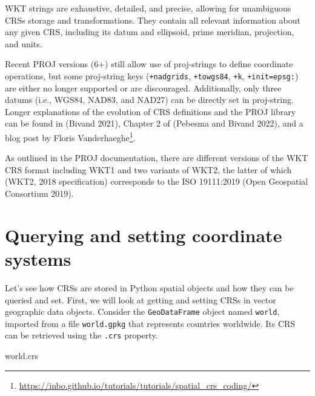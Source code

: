 \documentclass[
  letterpaper,
]{krantz}
\newenvironment{Shaded}{\begin{snugshade}}{\end{snugshade}}
\newcommand{\NormalTok}[1]{\textcolor[rgb]{0.00,0.23,0.31}{#1}}
\begin{document}
WKT strings are exhaustive, detailed, and precise, allowing for
unambiguous CRSs storage and transformations. They contain all relevant
information about any given CRS, including its datum and ellipsoid,
prime meridian, projection, and units.

Recent PROJ versions (6+) still allow use of proj-strings to define
coordinate operations, but some proj-string keys (\texttt{+nadgrids},
\texttt{+towgs84}, \texttt{+k}, \texttt{+init=epsg:}) are either no
longer supported or are discouraged. Additionally, only three datums
(i.e., WGS84, NAD83, and NAD27) can be directly set in proj-string.
Longer explanations of the evolution of CRS definitions and the PROJ
library can be found in (Bivand 2021), Chapter 2 of (Pebesma and Bivand
2022), and a blog post by Floris Vanderhaeghe\footnote{\url{https://inbo.github.io/tutorials/tutorials/spatial_crs_coding/}}.

\begin{tcolorbox}[enhanced jigsaw, colframe=quarto-callout-note-color-frame, arc=.35mm, leftrule=.75mm, bottomrule=.15mm, coltitle=black, colbacktitle=quarto-callout-note-color!10!white, title=\textcolor{quarto-callout-note-color}{\faInfo}\hspace{0.5em}{Note}, opacityback=0, toptitle=1mm, bottomtitle=1mm, colback=white, opacitybacktitle=0.6, titlerule=0mm, rightrule=.15mm, toprule=.15mm, breakable, left=2mm]

As outlined in the PROJ documentation, there are different versions of
the WKT CRS format including WKT1 and two variants of WKT2, the latter
of which (WKT2, 2018 specification) corresponds to the ISO 19111:2019
(Open Geospatial Consortium 2019).

\end{tcolorbox}

\section{Querying and setting coordinate
systems}\label{sec-querying-and-setting-coordinate-systems}

Let's see how CRSs are stored in Python spatial objects and how they can
be queried and set. First, we will look at getting and setting CRSs in
vector geographic data objects. Consider the \texttt{GeoDataFrame}
object named \texttt{world}, imported from a file \texttt{world.gpkg}
that represents countries worldwide. Its CRS can be retrieved using the
\texttt{.crs} property.

\begin{Shaded}
\begin{Highlighting}[]
\NormalTok{world.crs}
\end{Highlighting}
\end{Shaded}
\end{document}
